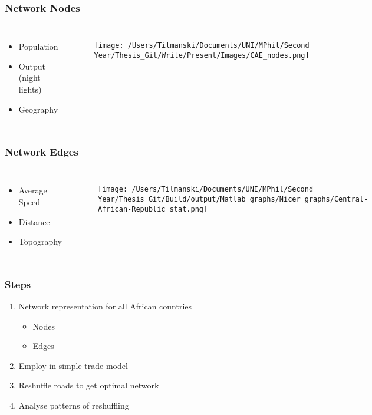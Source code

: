 \documentclass[]{beamer}   	%
\begin{document}
\begin{frame}
  \frametitle{Network Nodes}
  \begin{columns}
      \begin{itemize}
        \item Population
        \item Output (night lights)
        \item Geography
      \end{itemize}
  \begin{figure}
    \centering
    \texttt{[image: /Users/Tilmanski/Documents/UNI/MPhil/Second Year/Thesis\_Git/Write/Present/Images/CAE\_nodes.png]}
  \end{figure}
  \end{columns}
\end{frame}

\begin{frame}
  \frametitle{Network Edges}
  \begin{columns}
      \begin{itemize}
        \item Average Speed
        \item Distance
        \item Topography
      \end{itemize}
  \begin{figure}
    \centering
    \texttt{[image: /Users/Tilmanski/Documents/UNI/MPhil/Second Year/Thesis\_Git/Build/output/Matlab\_graphs/Nicer\_graphs/Central-African-Republic\_stat.png]}
  \end{figure}
  \end{columns}
\end{frame}

\begin{frame}
  \frametitle{Steps}
  \begin{enumerate}
    \item Network representation for all African countries
    \begin{itemize}
      \item Nodes
      \item Edges
    \end{itemize}
    \item \alert{Employ in simple trade model}
    \item Reshuffle roads to get optimal network
    \item Analyse patterns of reshuffling
  \end{enumerate}
\end{frame}
\end{document}

